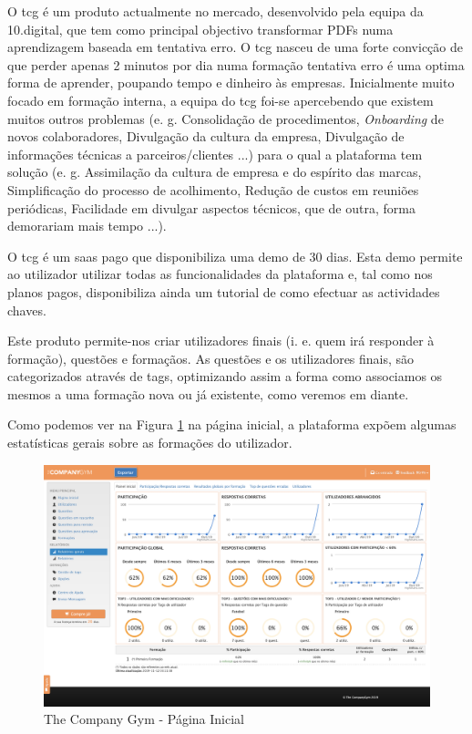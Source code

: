 O \acrlong{tcg} é um produto actualmente no mercado, desenvolvido pela equipa da 10.digital, que tem como principal objectivo transformar PDFs numa aprendizagem baseada em tentativa erro. O \acrshort{tcg} nasceu de uma forte convicção de que perder apenas 2 minutos por dia numa formação tentativa erro é uma optima forma de aprender, poupando tempo e dinheiro às empresas. Inicialmente muito focado em formação interna, a equipa do \acrshort{tcg} foi-se apercebendo que existem muitos outros problemas (e. g. Consolidação de procedimentos, \textit{Onboarding} de novos colaboradores, Divulgação da cultura da empresa, Divulgação de informações técnicas a parceiros/clientes ...) para o qual a plataforma tem solução (e. g. Assimilação da cultura de empresa e do espírito das marcas, Simplificação do processo de acolhimento, Redução de custos em reuniões periódicas, Facilidade em divulgar aspectos técnicos, que de outra, forma demorariam mais tempo ...).\cite{tcginfo}

O \acrshort{tcg} é um \acrshort{saas} pago que disponibiliza uma demo de 30 dias. Esta demo permite ao utilizador utilizar todas as funcionalidades da plataforma e, tal como nos planos pagos, disponibiliza ainda um tutorial de como efectuar as actividades chaves.

Este produto permite-nos criar utilizadores finais (i. e. quem irá responder à formação), questões e formaçãos. As questões e os utilizadores finais, são categorizados através de tags, optimizando assim a forma como associamos os mesmos a uma formação nova ou já existente, como veremos em diante.

Como podemos ver na Figura \ref{fig:tcg-homepage} na página inicial, a plataforma expõem algumas estatísticas gerais sobre as formações do utilizador.

\newpage


\begin{figure}[ht!]
	\begin{center}
		\includegraphics[width=1\textwidth]{img/tcg/tcg-homepage.png}
		\caption{The Company Gym - Página Inicial}
		\label{fig:tcg-homepage}
	\end{center}
\end{figure}

